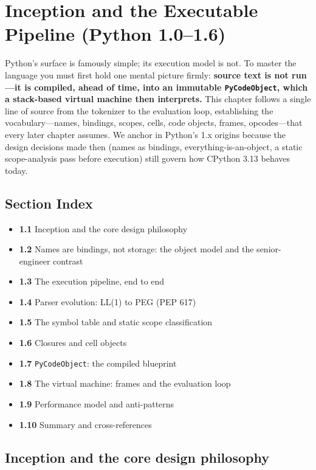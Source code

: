 \chapter{Inception and the Executable Pipeline (Python 1.0--1.6)}

Python's surface is famously simple; its execution model is not. To master the language
you must first hold one mental picture firmly: \textbf{source text is not run---it is
compiled, ahead of time, into an immutable \texttt{PyCodeObject}, which a stack-based
virtual machine then interprets.} This chapter follows a single line of source from the
tokenizer to the evaluation loop, establishing the vocabulary---names, bindings, scopes,
cells, code objects, frames, opcodes---that every later chapter assumes. We anchor in
Python's 1.x origins because the design decisions made then (names as bindings,
everything-is-an-object, a static scope-analysis pass before execution) still govern how
CPython 3.13 behaves today.

\section*{Section Index}
\begin{itemize}
  \item \textbf{1.1} Inception and the core design philosophy
  \item \textbf{1.2} Names are bindings, not storage: the object model and the senior-engineer contrast
  \item \textbf{1.3} The execution pipeline, end to end
  \item \textbf{1.4} Parser evolution: LL(1) to PEG (PEP 617)
  \item \textbf{1.5} The symbol table and static scope classification
  \item \textbf{1.6} Closures and cell objects
  \item \textbf{1.7} \texttt{PyCodeObject}: the compiled blueprint
  \item \textbf{1.8} The virtual machine: frames and the evaluation loop
  \item \textbf{1.9} Performance model and anti-patterns
  \item \textbf{1.10} Summary and cross-references
\end{itemize}

\section{Inception and the core design philosophy}

